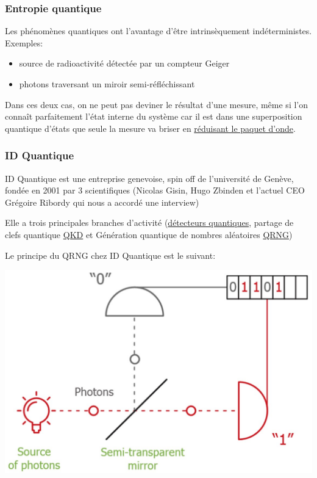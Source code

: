 \documentclass{scrartcl}
\begin{document}
\subsubsection{Entropie quantique}
Les phénomènes quantiques ont l’avantage d’être intrinsèquement indéterministes. 
Exemples: 
\begin{itemize}
\item source de radioactivité détectée par un compteur Geiger
\item photons traversant un miroir semi-réfléchissant
\end{itemize}
Dans ces deux cas, on ne peut pas deviner le résultat d’une mesure, même si l'on connaît parfaitement l’état interne du système car il est dans une superposition quantique d’états que seule la mesure va briser en \href{https://fr.wikipedia.org/wiki/R\%C3\%A9duction_du_paquet_d\%27onde}{réduisant le paquet d’onde}.

\subsubsection{ID Quantique}
ID Quantique est une entreprise genevoise, spin off de l’université de Genève, fondée en 2001 par 3 scientifiques (Nicolas Gisin, Hugo Zbinden et l’actuel CEO Grégoire Ribordy qui nous a accordé une interview) \par
Elle a trois principales branches d’activité (\href{https://www.idquantique.com/quantum-sensing/overview/}{détecteurs quantiques}, partage de clefs quantique \href{https://www.idquantique.com/quantum-safe-security/overview/}{QKD} et Génération quantique de nombres aléatoires \href{https://www.idquantique.com/random-number-generation/overview/}{QRNG}) \par
Le principe du QRNG chez ID Quantique est le suivant:
\begin{center}
  \includegraphics[scale=0.25]{img/Figure1.OpticalSystemUsedTuGenerateRandomNumbers.jpg}  
\end{center}
\end{document}
